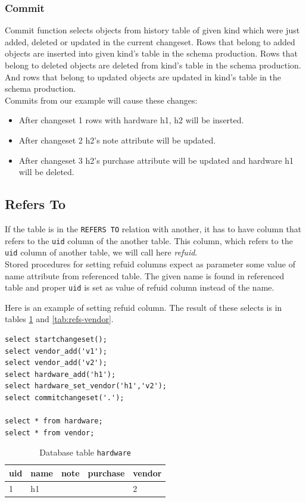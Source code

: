 \documentclass[deska]{subfiles}
\begin{document}
\subsubsection{Commit}
Commit function selects objects from history table of given kind which were just added, deleted or updated in the current changeset. Rows that belong to added objects are inserted into given kind's table in the schema production. Rows that belong to deleted objects are deleted from kind's table in the schema production. And rows that belong to updated objects are updated in kind's table in the schema production.\\
Commits from our example will cause these changes:
\begin{itemize}
    \item After changeset 1 rows with hardware h1, h2 will be inserted.
    \item After changeset 2 h2's note attribute will be updated.
    \item After changeset 3 h2's purchase attribute will be updated and hardware h1 will be deleted.
\end{itemize}

\subsection{Refers To}
\label{sec:db-refs-to}
If the table is in the {\tt REFERS TO} relation with another, it has to have column that refers to the {\tt uid} column of the another table. This column, which refers to the {\tt uid} column of another table, we will call here {\em refuid}.\\
Stored procedures for setting refuid columns expect as parameter some value of name attribute from referenced table. The given name is found in referenced table and proper {\tt uid} is set as value of refuid column instead of the name.

Here is an example of setting refuid column. The result of these selects is in tables \ref{tab:refs-hardware} and  \ref{tab:refs-vendor}.
\begin{verbatim}
select startchangeset();
select vendor_add('v1');
select vendor_add('v2');
select hardware_add('h1');
select hardware_set_vendor('h1','v2');
select commitchangeset('.');

select * from hardware;
select * from vendor;
\end{verbatim}

\begin{longtable}{ l | l | l | l | l }
    \caption{Database table {\tt hardware}}
    \label{tab:refs-hardware} \\
    uid & name & note & purchase & vendor\\
    \hline
    \endhead
    1 & h1 &  &  & 2\\
    \hline
\end{longtable}
\end{document}
